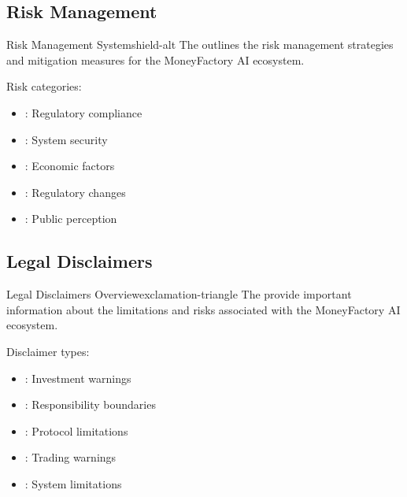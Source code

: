 \subsection{Risk Management}

\begin{mfai-box-build}{Risk Management System}{shield-alt}
The  outlines the risk management strategies and mitigation measures for the MoneyFactory AI ecosystem.
\end{mfai-box-build}

Risk categories:

\begin{itemize}[leftmargin=*]
\item {}: Regulatory compliance
\item {}: System security
\item {}: Economic factors
\item {}: Regulatory changes
\item {}: Public perception
\end{itemize}

\subsection{Legal Disclaimers}

\begin{mfai-box-prove}{Legal Disclaimers Overview}{exclamation-triangle}
The  provide important information about the limitations and risks associated with the MoneyFactory AI ecosystem.
\end{mfai-box-prove}

Disclaimer types:

\begin{itemize}[leftmargin=*]
\item {}: Investment warnings
\item {}: Responsibility boundaries
\item {}: Protocol limitations
\item {}: Trading warnings
\item {}: System limitations
\end{itemize}


